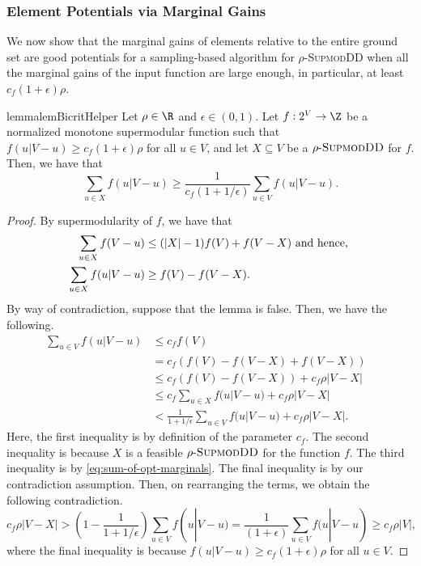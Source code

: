 \documentclass{article}
\newcommand{\supmoddensitydeletionset}{\textsc{SupmodDD}\xspace}
\newcommand{\sdds}{\ensuremath{\textsc{SupmodDD}}\xspace}
\newcommand{\rhosdds}[1]{\ensuremath{#1\text{-}\sdds}}
\begin{document}
\subsubsection{Element Potentials via Marginal Gains}\label{sec:element-potentials}
We now show that the marginal gains of elements relative to the entire ground set are good potentials for a sampling-based algorithm for $\rho$-\supmoddensitydeletionset when all the marginal gains of the input function are large enough, in particular, at least $c_f(1+\epsilon)\rho$. 

\begin{restatable}{lemma}{lemBicritHelper}\label{lem:bicriteria-random-deletion-helper:main}
Let $\rho\in \R$ and $\epsilon \in (0, 1)$. Let $f:2^V\rightarrow\Z$ be a normalized monotone supermodular function such that $f(u|V - u) \geq c_f(1+\epsilon)\rho$ for all $u \in V$, and let $X \subseteq V$ be a \rhosdds{\rho} for $f$. Then, we have that
$$\sum_{u \in X} f(u|V-u) \geq \frac{1}{c_f (1 + 1/\epsilon)}\sum_{u \in V}f(u|V-u).$$
\end{restatable}
\begin{proof}
By supermodularity of $f$, we have that 
\begin{align}
\sum_{u\in X}f(V-u)&\le (|X|-1)f(V) + f(V-X) \text{ and hence, }\notag\\
\sum_{u\in X}f(u|V-u) &\ge f(V) -f(V-X). \label{eq:sum-of-opt-marginals}
\end{align}
By way of contradiction, suppose that the lemma is false. Then, we have the following.
    \begin{align*}
        \sum_{u \in V}f(u | V-u)& \leq c_{f} f(V)&\\
        &= c_{f}(f(V) - f(V - X) + f(V - X))&\\
        &\leq c_f\left(f(V) - f(V - X)\right) + c_f\rho|V - X|&\\
        &\leq c_f\sum_{u \in X}f(u|V-u) + c_f\rho|V - X|&\\
        &< \frac{1}{1 + 1/\epsilon}\sum_{u \in V}f(u|V-u) + c_f \rho|V - X|.&
    \end{align*}
    Here, the first inequality is by definition of the parameter $c_f$. The second inequality is because $X$ is a feasible \rhosdds{\rho} for the function $f$. The third inequality is by \eqref{eq:sum-of-opt-marginals}. 
The final inequality is by our contradiction assumption.
    Then, on rearranging the terms, we obtain the following contradiction.
    $$c_f\rho|V - X| > \left(1 - \frac{1}{1+ 1/\epsilon}\right)\sum_{u \in V}f(u|V-u) = \frac{1}{(1+\epsilon)}\sum_{u \in V}f(u|V-u) \geq c_f\rho|V|,$$
   where the final inequality is because $f(u|V-u) \geq c_f(1+\epsilon)\rho$ for all $u \in V$.
   \end{proof}
\end{document}
